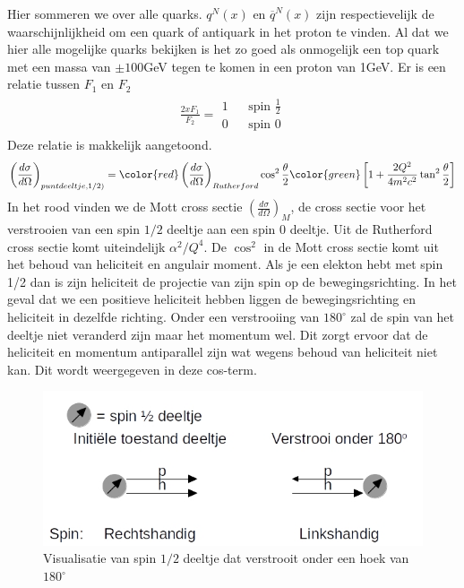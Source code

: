 \documentclass[../main.tex]{subfiles}
\begin{document}
Hier sommeren we over alle quarks. $q^N(x)$ en $\overline q^N(x)$ zijn respectievelijk de waarschijnlijkheid om een quark of antiquark in het proton te vinden. Al dat we hier alle mogelijke quarks bekijken is het zo goed als onmogelijk een top quark met een massa van $\pm100$GeV tegen te komen in een proton van 1GeV. Er is een relatie tussen $F_1$ en $F_2$
\begin{equation}
    \begin{aligned}
        \label{eq:struct_func_rel}
        \frac{2xF_1}{F_2} =
        \begin{matrix}
            1 & & \text{spin } \frac{1}{2} \\
            0 & & \text{spin } 0
        \end{matrix}
    \end{aligned}
\end{equation}
Deze relatie is makkelijk aangetoond.
\begin{equation}
    \begin{aligned}
        \label{eq:bewijs_struct_func_rel_1}
        \left(\frac{d\sigma}{d\Omega}\right)_{puntdeeltje,1/2)} = {\color{red} \left(\frac{d\sigma}{d\Omega}\right)_{Rutherford}\cos^2  \frac{\theta}{2}} {\color{green} \left[1+ \frac{2Q^2}{4m^2c^2} \tan^2 \frac{\theta}{2} \right]}
    \end{aligned}
\end{equation}
In het rood vinden we de Mott cross sectie $\left(\frac{d\sigma}{d\Omega}\right)_{M}$, de cross sectie voor het verstrooien van een spin $1/2$ deeltje aan een spin $0$ deeltje. Uit de Rutherford cross sectie komt uiteindelijk $\alpha^2/Q^4$. De $\cos^2$ in de Mott cross sectie komt uit het behoud van heliciteit en angulair moment. Als je een elekton hebt met spin 1/2 dan is zijn heliciteit de projectie van zijn spin op de bewegingsrichting. In het geval dat we een positieve heliciteit hebben liggen de bewegingsrichting en heliciteit in dezelfde richting. Onder een verstrooiing van $180^\circ$ zal de spin van het deeltje niet veranderd zijn maar het momentum wel. Dit zorgt ervoor dat de heliciteit en momentum antiparallel zijn wat wegens behoud van heliciteit niet kan. Dit wordt weergegeven in deze cos-term.

\begin{figure}[h]
    \centering
    \includegraphics[width=0.8\linewidth]{DIS_nucleon_structuur_pdf/mot_cross_section.jpg}
    \caption{Visualisatie van spin $1/2$ deeltje dat verstrooit onder een hoek van $180^\circ$}%
    \label{fig:mot_cross_section}
\end{figure}
\end{document}
